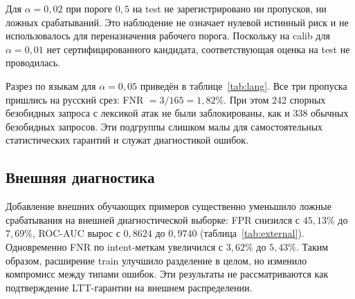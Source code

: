 \documentclass{misisarticle}
\begin{document}
Для $\alpha=0{,}02$ при пороге $0{,}5$ на test не зарегистрировано ни пропусков, ни ложных срабатываний. Это наблюдение не означает нулевой истинный риск и не использовалось для переназначения рабочего порога. Поскольку на calib для $\alpha=0{,}01$ нет сертифицированного кандидата, соответствующая оценка на test не проводилась.

\begin{table}[t]
  \caption{Финальные результаты на own test}
  \label{tab:test}
  \centering
\end{table}

Разрез по языкам для $\alpha=0{,}05$ приведён в таблице~\ref{tab:lang}. Все три пропуска пришлись на русский срез: FNR $=3/165=1{,}82\%$. При этом 242 спорных безобидных запроса с лексикой атак не были заблокированы, как и 338 обычных безобидных запросов. Эти подгруппы слишком малы для самостоятельных статистических гарантий и служат диагностикой ошибок.

\begin{table}[t]
  \caption{Результаты по языкам на own test при $\alpha=0{,}05$}
  \label{tab:lang}
  \centering
\end{table}

\subsection{Внешняя диагностика}

Добавление внешних обучающих примеров существенно уменьшило ложные срабатывания на внешней диагностической выборке: FPR снизился с $45{,}13\%$ до $7{,}69\%$, ROC-AUC вырос с $0{,}8624$ до $0{,}9740$ (таблица~\ref{tab:external}). Одновременно FNR по intent-меткам увеличился с $3{,}62\%$ до $5{,}43\%$. Таким образом, расширение train улучшило разделение в целом, но изменило компромисс между типами ошибок. Эти результаты не рассматриваются как подтверждение LTT-гарантии на внешнем распределении.
\end{document}
